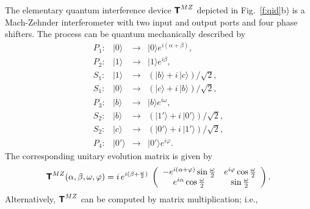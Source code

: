 \documentclass[prl,amsfonts,amsmath,showpacs,showkeys,preprint]{revtex4}
\begin{document}
The
elementary quantum interference device ${\textsf{\textbf{T}}}^{MZ}$ depicted in
Fig.~\ref{f:qid}b)
is a Mach-Zehnder interferometer with  two
input and output ports and four phase shifters.
The process can
be quantum mechanically described by
\begin{equation}
\begin{array}{rlcl}
P_1:&\vert {0}\rangle  &\rightarrow& \vert {0}\rangle e^{i
(\alpha +\beta )} , \\
P_2:&\vert {1}\rangle  &\rightarrow& \vert {1}\rangle e^{i
\beta} , \\
S_1:&\vert {1}\rangle  &\rightarrow& (\vert b\rangle  +i\,\vert
c\rangle )/\sqrt{2} , \\
S_1:&\vert {0}\rangle  &\rightarrow& (\vert c\rangle  +i\,\vert
b\rangle )/\sqrt{2}, \\
P_3:&\vert b\rangle  &\rightarrow& \vert b\rangle e^{i \omega },\\
S_2:&\vert b\rangle  &\rightarrow& (\vert {1}'\rangle  + i\, \vert
{0}'\rangle )/\sqrt{2} ,\\
S_2:&\vert c\rangle  &\rightarrow& (\vert {0}'\rangle  + i\, \vert
{1}'\rangle )/\sqrt{2} ,\\
P_4:&\vert {0}'\rangle  &\rightarrow& \vert {0}'\rangle e^{i
\varphi
}.
\end{array}
\end{equation}
The corresponding unitary evolution matrix
is given by
\begin{equation}
{\textsf{\textbf{T}}}^{MZ} (\alpha ,\beta ,\omega ,\varphi )=
i \, e^{i(\beta +{\omega \over 2})}\;\left(
\begin{array}{cc}
-e^{i(\alpha +  \varphi )}\sin {\omega \over 2}
&
e^{i  \varphi }\cos {\omega \over 2} \\
e^{i  \alpha }\cos {\omega \over 2}
&
\sin {{\omega }\over 2}
 \end{array}
\right)
.
\label{e:quid2}
\end{equation}
Alternatively, ${\textsf{\textbf{T}}}^{MZ}$ can be computed by matrix multiplication; i.e.,
\end{document}
